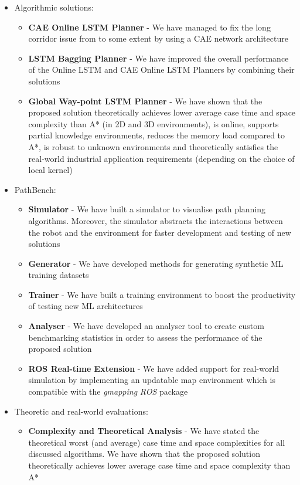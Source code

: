 \begin{itemize}
    \item Algorithmic solutions: \begin{itemize}
        \item \textbf{CAE Online LSTM Planner} - We have managed to fix the long corridor issue from \cite{nicola2018lstm} to some extent by using a CAE network architecture
        \item \textbf{LSTM Bagging Planner} - We have improved the overall performance of the Online LSTM and CAE Online LSTM Planners by combining their solutions
        \item \textbf{Global Way-point LSTM Planner} - We have shown that the proposed solution theoretically achieves lower average case time and space complexity than A* (in 2D and 3D environments), is online, supports partial knowledge environments, reduces the memory load compared to A*, is robust to unknown environments and theoretically satisfies the real-world industrial application requirements (depending on the choice of local kernel)
    \end{itemize}
    \item PathBench: 
    \begin{itemize}
        \item \textbf{Simulator} - We have built a simulator to visualise path planning algorithms. Moreover, the simulator abstracts the interactions between the robot and the environment for faster development and testing of new solutions
        \item \textbf{Generator} - We have developed methods for generating synthetic ML training datasets
        \item \textbf{Trainer} - We have built a training environment to boost the productivity of testing new ML architectures
        \item \textbf{Analyser} - We have developed an analyser tool to create custom benchmarking statistics in order to assess the performance of the proposed solution
        \item \textbf{ROS Real-time Extension} - We have added support for real-world simulation by implementing an updatable map environment which is compatible with the \textit{gmapping} \textit{ROS} package
    \end{itemize}
    \item Theoretic and real-world evaluations: \begin{itemize}
        \item \textbf{Complexity and Theoretical Analysis} - We have stated the theoretical worst (and average) case time and space complexities for all discussed algorithms. We have shown that the proposed solution theoretically achieves lower average case time and space complexity than A*

\end{itemize}
\end{itemize}
